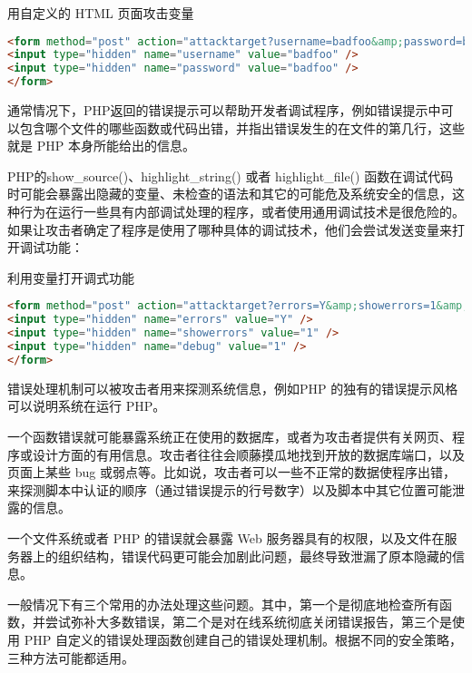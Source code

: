 \begin{example}
用自定义的 HTML 页面攻击变量
\begin{lstlisting}[language=HTML]
<form method="post" action="attacktarget?username=badfoo&amp;password=badfoo">
<input type="hidden" name="username" value="badfoo" />
<input type="hidden" name="password" value="badfoo" />
</form>
\end{lstlisting}
\end{example}




通常情况下，PHP返回的错误提示可以帮助开发者调试程序，例如错误提示中可以包含哪个文件的哪些函数或代码出错，并指出错误发生的在文件的第几行，这些就是 PHP 本身所能给出的信息。

PHP的show\_source()、highlight\_string() 或者 highlight\_file() 函数在调试代码时可能会暴露出隐藏的变量、未检查的语法和其它的可能危及系统安全的信息，这种行为在运行一些具有内部调试处理的程序，或者使用通用调试技术是很危险的。如果让攻击者确定了程序是使用了哪种具体的调试技术，他们会尝试发送变量来打开调试功能：



\begin{example}
利用变量打开调式功能
\begin{lstlisting}[language=HTML]
<form method="post" action="attacktarget?errors=Y&amp;showerrors=1&amp;debug=1">
<input type="hidden" name="errors" value="Y" />
<input type="hidden" name="showerrors" value="1" />
<input type="hidden" name="debug" value="1" />
</form>
\end{lstlisting}
\end{example}


错误处理机制可以被攻击者用来探测系统信息，例如PHP 的独有的错误提示风格可以说明系统在运行 PHP。

一个函数错误就可能暴露系统正在使用的数据库，或者为攻击者提供有关网页、程序或设计方面的有用信息。攻击者往往会顺藤摸瓜地找到开放的数据库端口，以及页面上某些 bug 或弱点等。比如说，攻击者可以一些不正常的数据使程序出错，来探测脚本中认证的顺序（通过错误提示的行号数字）以及脚本中其它位置可能泄露的信息。

一个文件系统或者 PHP 的错误就会暴露 Web 服务器具有的权限，以及文件在服务器上的组织结构，错误代码更可能会加剧此问题，最终导致泄漏了原本隐藏的信息。

一般情况下有三个常用的办法处理这些问题。其中，第一个是彻底地检查所有函数，并尝试弥补大多数错误，第二个是对在线系统彻底关闭错误报告，第三个是使用 PHP 自定义的错误处理函数创建自己的错误处理机制。根据不同的安全策略，三种方法可能都适用。

